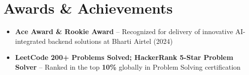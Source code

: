 \documentclass[letterpaper,11pt]{article}
\begin{document}
\section{Awards \& Achievements}
\begin{itemize}[leftmargin=0.15in]
  \item \small{\textbf{Ace Award \& Rookie Award} -- Recognized for delivery of innovative AI-integrated backend solutions at Bharti Airtel (2024)}
  \item \small{\textbf{LeetCode 200+ Problems Solved; HackerRank 5-Star Problem Solver} -- Ranked in the top \textbf{10\%} globally in Problem Solving certification}
\end{itemize}
\end{document}
